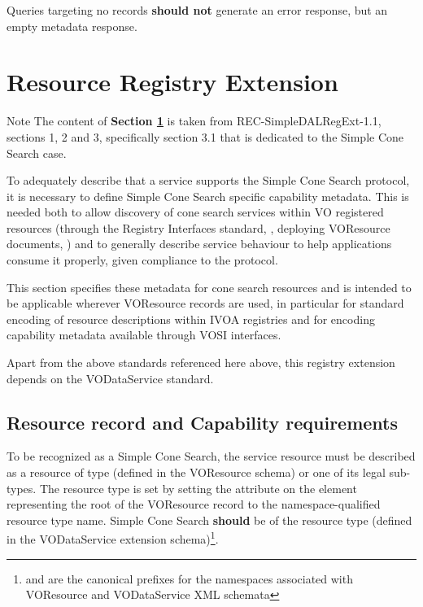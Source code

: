 \documentclass[11pt,a4paper]{ivoa} 
\begin{document}
Queries targeting no records \textbf{should not} generate an error
response, but an empty metadata response.

\section{Resource Registry Extension} \label{sec:regext}

\begin{admonition}{Note} The content of \textbf{Section
\ref{sec:regext}} is taken from REC-SimpleDALRegExt-1.1, sections 1, 2
and 3, specifically section 3.1 that is dedicated to the Simple Cone
Search case.  \end{admonition}

To adequately describe that a service supports the Simple Cone Search
protocol, it is necessary to define Simple Cone Search specific
capability metadata. This is needed both to allow discovery of cone
search services within VO registered resources (through the Registry
Interfaces standard, \citet{std:RI1}, deploying VOResource documents,
\citet{std:VOR}) and to generally describe service behaviour to help
applications consume it properly, given compliance to the protocol.

This section specifies these metadata for cone search resources and is
intended to be applicable wherever VOResource records are used, in
particular for standard encoding of resource descriptions within IVOA
registries and for encoding capability metadata available through VOSI
\citep{std:VOSI11} interfaces.

Apart from the above standards referenced here above, this registry
extension depends on the VODataService \citep{std:VODS11} standard.

\subsection{Resource record and Capability requirements} To be
recognized as a Simple Cone Search, the service resource must be
described as a resource of type  (defined in the
VOResource schema) or one of its legal sub-types. The resource type is
set by setting the  attribute on the element
representing the root of the VOResource record to the
namespace-qualified resource type name. Simple Cone Search
\textbf{should} be of the resource type 
(defined in the VODataService extension schema)\footnote{ and
 are the canonical prefixes for the namespaces associated
with VOResource and VODataService XML schemata}. 
\end{document}
